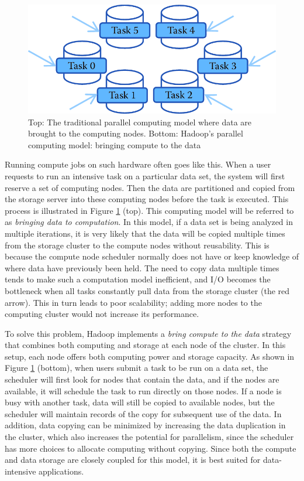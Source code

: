 \documentclass[]{krantz}
\begin{document}
\begin{figure}

{\centering \includegraphics[width=0.7\linewidth]{ChapterParallel/figures/compute2data} 

}

\caption{Top: The traditional parallel computing model where data are brought to the computing nodes. Bottom: Hadoop’s parallel computing model: bringing compute to the data \citep{HadoopParallelModel}}\label{fig:fig5-1a}
\end{figure}

Running compute jobs on such hardware often goes like this. When a user
requests to run an intensive task on a particular data set, the system
will first reserve a set of computing nodes. Then the data are
partitioned and copied from the storage server into these computing
nodes before the task is executed. This process is illustrated in Figure
\ref{fig:fig5-1a} (top). This computing model will be referred to as
\emph{bringing data to computation}. In this model, if a data set is
being analyzed in multiple iterations, it is very likely that the data
will be copied multiple times from the storage cluster to the compute
nodes without reusability. This is because the compute node scheduler
normally does not have or keep knowledge of where data have previously
been held. The need to copy data multiple times tends to make such a
computation model inefficient, and I/O becomes the bottleneck when all
tasks constantly pull data from the storage cluster (the red arrow).
This in turn leads to poor scalability; adding more nodes to the
computing cluster would not increase its performance.

To solve this problem, Hadoop implements a \emph{bring compute to the
data} strategy that combines both computing and storage at each node of
the cluster. In this setup, each node offers both computing power and
storage capacity. As shown in Figure \ref{fig:fig5-1a} (bottom), when
users submit a task to be run on a data set, the scheduler will first
look for nodes that contain the data, and if the nodes are available, it
will schedule the task to run directly on those nodes. If a node is busy
with another task, data will still be copied to available nodes, but the
scheduler will maintain records of the copy for subsequent use of the
data. In addition, data copying can be minimized by increasing the data
duplication in the cluster, which also increases the potential for
parallelism, since the scheduler has more choices to allocate computing
without copying. Since both the compute and data storage are closely
coupled for this model, it is best suited for data-intensive
applications.
\end{document}
